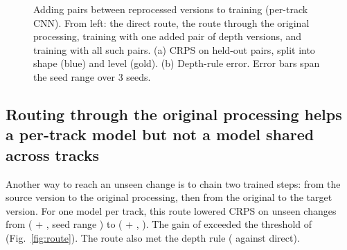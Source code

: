 \documentclass[pdflatex,sn-mathphys-num]{sn-jnl}
\newcommand{\lit}[1]{#1}
\begin{document}
\begin{figure}[t]
\centering
{}
\caption{Adding pairs between reprocessed versions to training (per-track CNN). From left: the
direct route, the route through the original processing, training with one added pair of
depth versions, and training with all such pairs. (a) CRPS on held-out pairs, split into shape
(blue) and level (gold). (b) Depth-rule error. Error bars span the seed range over \lit{3}
seeds.}\label{fig:arm}
\end{figure}

\subsection{Routing through the original processing helps a per-track model but not a model shared across tracks}\label{sec:r8}

Another way to reach an unseen change is to chain two trained steps: from the source version
to the original processing, then from the original to the target version. For one model per
track, this route lowered CRPS on unseen changes from \ptDir{} (\ptDirOS{} + \ptDirSE{}, seed
range \ptDirS{}) to \ptVia{} (\ptViaOS{} + \ptViaSE{}, \ptViaS{}). The gain of \ptGain{} exceeded
the threshold of \ptBar{} (Fig.~\ref{fig:route}). The route also met the depth rule (\ptRuleVia{}
against \ptRuleDir{} direct).
\end{document}
